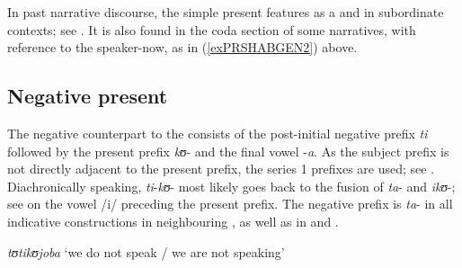 In past narrative discourse, the simple present features as a  and in subordinate contexts; see . It is also found in the coda section of some narratives, with reference to the speaker-now, as in (\ref{exPRSHABGEN2}) above.
\subsection{Negative present}\label{NegPresent}
The negative counterpart to the  consists of the post-initial negative prefix \textit{ti} followed by the present prefix \textit{kʊ}- and the final vowel -\textit{a}. As the subject prefix is not directly adjacent to the present prefix, the series 1 prefixes are used; see . Diachronically speaking, \textit{ti}-\textit{kʊ}- most likely goes back to the fusion of \textit{ta}- and \textit{ikʊ}-; see  on the vowel /i/ preceding the present prefix. The negative prefix is \textit{ta}- in all indicative constructions in neighbouring  \citep[77]{KishindoP1999}, as well as in  \citep[108--116]{BotneR2008} and  \citep[45--51]{KershnerT2002}.

\begin{exe}
\ex \textit{tʊtikʊjoba} \lq we do not speak / we are not speaking'
\end{exe}

